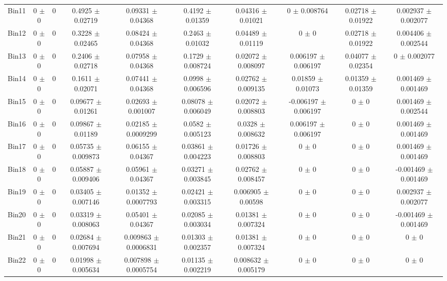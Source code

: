 \begin{tabular}{@{\extracolsep{4pt}}lccccccccc@{}}
     Bin11 & 0 $\pm$ 0 & 0 & 0.4925 $\pm$ 0.02719 & 0.09331 $\pm$ 0.04368 & 0.4192 $\pm$ 0.01359 & 0.04316 $\pm$ 0.01021 & 0 $\pm$ 0.008764 & 0.02718 $\pm$ 0.01922 & 0.002937 $\pm$ 0.002077 \\ 
     Bin12 & 0 $\pm$ 0 & 0 & 0.3228 $\pm$ 0.02465 & 0.08424 $\pm$ 0.04368 & 0.2463 $\pm$ 0.01032 & 0.04489 $\pm$ 0.01119 & 0 $\pm$ 0 & 0.02718 $\pm$ 0.01922 & 0.004406 $\pm$ 0.002544 \\ 
     Bin13 & 0 $\pm$ 0 & 0 & 0.2406 $\pm$ 0.02718 & 0.07958 $\pm$ 0.04368 & 0.1729 $\pm$ 0.008724 & 0.02072 $\pm$ 0.008097 & 0.006197 $\pm$ 0.006197 & 0.04077 $\pm$ 0.02354 & 0 $\pm$ 0.002077 \\ 
     Bin14 & 0 $\pm$ 0 & 0 & 0.1611 $\pm$ 0.02071 & 0.07441 $\pm$ 0.04368 & 0.0998 $\pm$ 0.006596 & 0.02762 $\pm$ 0.009135 & 0.01859 $\pm$ 0.01073 & 0.01359 $\pm$ 0.01359 & 0.001469 $\pm$ 0.001469 \\ 
     Bin15 & 0 $\pm$ 0 & 0 & 0.09677 $\pm$ 0.01261 & 0.02693 $\pm$ 0.001007 & 0.08078 $\pm$ 0.006049 & 0.02072 $\pm$ 0.008803 & -0.006197 $\pm$ 0.006197 & 0 $\pm$ 0 & 0.001469 $\pm$ 0.002544 \\ 
     Bin16 & 0 $\pm$ 0 & 0 & 0.09867 $\pm$ 0.01189 & 0.02185 $\pm$ 0.0009299 & 0.0582 $\pm$ 0.005123 & 0.0328 $\pm$ 0.008632 & 0.006197 $\pm$ 0.006197 & 0 $\pm$ 0 & 0.001469 $\pm$ 0.001469 \\ 
     Bin17 & 0 $\pm$ 0 & 0 & 0.05735 $\pm$ 0.009873 & 0.06155 $\pm$ 0.04367 & 0.03861 $\pm$ 0.004223 & 0.01726 $\pm$ 0.008803 & 0 $\pm$ 0 & 0 $\pm$ 0 & 0.001469 $\pm$ 0.001469 \\ 
     Bin18 & 0 $\pm$ 0 & 0 & 0.05887 $\pm$ 0.009406 & 0.05961 $\pm$ 0.04367 & 0.03271 $\pm$ 0.003845 & 0.02762 $\pm$ 0.008457 & 0 $\pm$ 0 & 0 $\pm$ 0 & -0.001469 $\pm$ 0.001469 \\ 
     Bin19 & 0 $\pm$ 0 & 0 & 0.03405 $\pm$ 0.007146 & 0.01352 $\pm$ 0.0007793 & 0.02421 $\pm$ 0.003315 & 0.006905 $\pm$ 0.00598 & 0 $\pm$ 0 & 0 $\pm$ 0 & 0.002937 $\pm$ 0.002077 \\ 
     Bin20 & 0 $\pm$ 0 & 0 & 0.03319 $\pm$ 0.008063 & 0.05401 $\pm$ 0.04367 & 0.02085 $\pm$ 0.003034 & 0.01381 $\pm$ 0.007324 & 0 $\pm$ 0 & 0 $\pm$ 0 & -0.001469 $\pm$ 0.001469 \\ 
     Bin21 & 0 $\pm$ 0 & 0 & 0.02684 $\pm$ 0.007694 & 0.009863 $\pm$ 0.0006831 & 0.01303 $\pm$ 0.002357 & 0.01381 $\pm$ 0.007324 & 0 $\pm$ 0 & 0 $\pm$ 0 & 0 $\pm$ 0 \\ 
     Bin22 & 0 $\pm$ 0 & 0 & 0.01998 $\pm$ 0.005634 & 0.007898 $\pm$ 0.0005754 & 0.01135 $\pm$ 0.002219 & 0.008632 $\pm$ 0.005179 & 0 $\pm$ 0 & 0 $\pm$ 0 & 0 $\pm$ 0 \\ 

\end{tabular}
